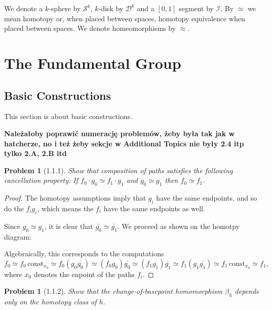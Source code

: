 \documentclass[11pt, a4paper, final]{amsart}
\newcommand\todo[1]{\textbf{\textcolor{redd}{#1}}}
\newcommand{\unit}{\mathcal{I}}
\newcommand{\sphere}{\mathcal{S}}
\newcommand{\disk}{\mathcal{D}}
\numberwithin{theorem}{section}
\newtheorem{problem}[theorem]{Problem}
\theoremstyle{definition}
\theoremstyle{remark}
\begin{document}
We denote a $k$-sphere by $\sphere^k$, $k$-disk by $\disk^k$ and a $[0, 1]$ segment by $\unit$. By $\simeq$ we mean homotopy or, when placed between spaces, homotopy equivalence when placed between spaces. We denote homeomorphisms by $\approx$.


\section{The Fundamental Group}

\subsection{Basic Constructions}

This section is about basic constructions.

\todo{Należałoby poprawić numerację problemów, żeby była tak jak w hatcherze, no i też żeby sekcje w Additional Topics nie były 2.4 itp tylko 2.A, 2.B itd}

\begin{problem}[1.1.1]\label{problem: 1.1.1}
Show that composition of paths satisfies the following cancellation property: If
$f_0 \cdot g_0 \simeq f_1 \cdot g_1$ and $g_0 \simeq g_1$ then $f_0 \simeq f_1$.
\end{problem}

\begin{proof}
    The homotopy assumptions imply that $g_i$ have the same endpoints, and so do the $f_ig_i$, which means the $f_i$ have the same endpoints as well.

    Since $g_0 \simeq g_1$, it is clear that $\bar{g_0} \simeq \bar{g_1}$. We proceed as shown on the homotpy diagram:

    \begin{center}
        
    \end{center}
    Algebraically, this corresponds to the computations
    \[
    f_0 \simeq f_0 \,\mathrm{const}_{x_0} \simeq f_0(g_0\overline{g_0}) \simeq (f_0g_0)\overline{g_0} \simeq (f_1g_1)\overline{g_1} \simeq f_1(g_1\overline{g_1})  \simeq f_1\,\mathrm{ const}_{x_0} \simeq f_1,
    \]
    where \(x_0\) denotes the enpoint of the paths $f_i$.
\end{proof}

\begin{problem}[1.1.2]\label{problem: 1.1.2}
    Show that the change-of-basepoint homomorphism $\beta_h$ depends only on the homotopy class of $h$.
\end{problem}
\end{document}
